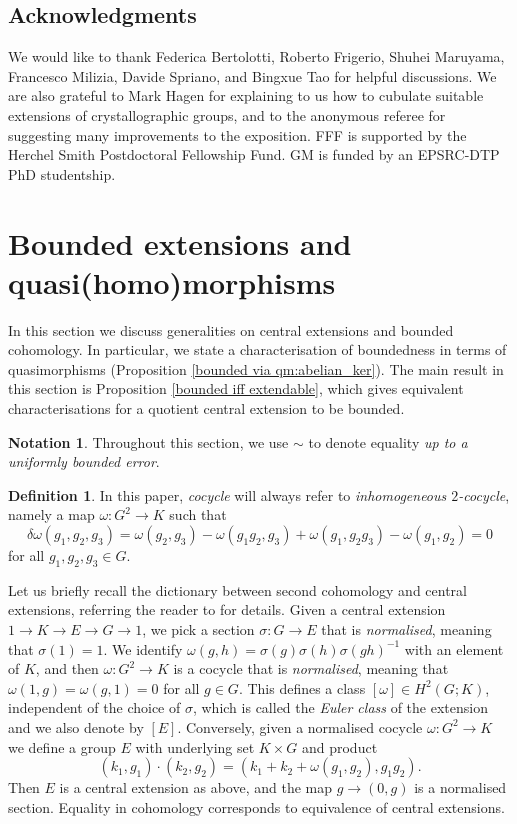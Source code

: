 \documentclass[svgnames]{amsart}
\theoremstyle{plain}
\theoremstyle{definition}
\newtheorem{defn}[thm]{Definition}
\newtheorem{notn}[thm]{Notation}
\begin{document}
\subsection*{Acknowledgments} We would like to thank Federica Bertolotti, Roberto Frigerio, Shuhei Maruyama, Francesco Milizia, Davide Spriano, and Bingxue Tao for helpful discussions. We are also grateful to Mark Hagen for explaining to us how to cubulate suitable extensions of crystallographic groups, and to the anonymous referee for suggesting many improvements to the exposition. FFF is supported by the Herchel Smith Postdoctoral Fellowship Fund. GM is funded by an EPSRC-DTP PhD studentship.


\section{Bounded extensions and quasi(homo)morphisms}\label{sec:background}
In this section we discuss generalities on central extensions and bounded cohomology. In particular, we state a characterisation of boundedness in terms of quasimorphisms (Proposition \ref{bounded via qm:abelian_ker}). The main result in this section is Proposition \ref{bounded iff extendable}, which gives equivalent characterisations for a quotient central extension to be bounded.

\begin{notn}
    Throughout this section, we use $\sim$ to denote equality \emph{up to a uniformly bounded error}.
\end{notn}

\begin{defn}
    In this paper, \emph{cocycle} will always refer to \emph{inhomogeneous $2$-cocycle}, namely a map $\omega \colon G^2 \to K$ such that
    \[\delta\omega(g_1, g_2, g_3) = \omega(g_2, g_3) - \omega(g_1g_2, g_3) + \omega(g_1, g_2g_3) - \omega(g_1, g_2) = 0\]
    for all $g_1, g_2, g_3 \in G$.
\end{defn}

Let us briefly recall the dictionary between second cohomology and central extensions, referring the reader to \cite[Chapter IV.3]{brown} for details. Given a central extension $1\to K\to E\to G\to 1$, we pick a section $\sigma \colon G \to E$ that is \emph{normalised}, meaning that $\sigma(1) = 1$. We identify $\omega(g, h) = \sigma(g)\sigma(h)\sigma(gh)^{-1}$ with an element of $K$, and then $\omega \colon G^2 \to K$ is a cocycle that is \emph{normalised}, meaning that $\omega(1, g) = \omega(g, 1) = 0$ for all $g \in G$. This defines a class $[\omega] \in H^2(G; K)$, independent of the choice of $\sigma$, which is called the \emph{Euler class} of the extension and we also denote by $[E]$. Conversely, given a normalised cocycle $\omega \colon G^2 \to K$ we define a group $E$ with underlying set $K \times G$ and product
\[(k_1, g_1) \cdot (k_2, g_2) = (k_1 + k_2 + \omega(g_1, g_2), g_1 g_2).\]
Then $E$ is a central extension as above, and the map $g \to (0, g)$ is a normalised section. Equality in cohomology corresponds to equivalence of central extensions.
\end{document}
